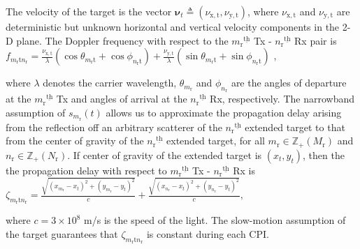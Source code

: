 \documentclass[10pt,journal]{IEEEtran}
\newcommand{\paren}[1]{\left({#1}\right)}
\newcommand{\ith}[1]    {{#1}^{\underline{\text{th}}}}
\newcommand{\rr}{_\mathrm{r}}
\newcommand{\target}{\mathrm{t}}
\theoremstyle{definition}
\begin{document}
	The velocity of the target is the vector  $\boldsymbol{\nu}_{t}\triangleq\left(\nu_\mathrm{\mathrm{x},t},\nu_\mathrm{\mathrm{y},t} \right)$, where $\nu_\mathrm{\mathrm{x},t}$ and $\nu_\mathrm{\mathrm{y},t}$ are deterministic but unknown horizontal and vertical velocity components in the 2-D plane. The Doppler frequency with respect to the $\ith{m\rr}$ Tx - $\ith{n\rr}$ Rx pair is $f_{m_\mathrm{r}\target n_\mathrm{r}} = \frac{\nu_\mathrm{\mathrm{x},t}}{\lambda}(\cos\theta_{m_\mathrm{r}\target}+\cos\phi_{n_\mathrm{r}\target})+\frac{\nu_\mathrm{\mathrm{y},\target}}{\lambda}(\sin\theta_{m_\mathrm{r}\target}+\sin\phi_{n_\mathrm{r}\target})$ \cite{hongbin_movingtarget},

	where $\lambda$ denotes the carrier wavelength, $\theta_{m_\mathrm{r}}$ and $\phi_{n_\mathrm{r}}$ are the angles of departure at the $\ith{m_\mathrm{r}}$ Tx and angles of arrival at the $\ith{n_\mathrm{r}}$ Rx, respectively. %
	The narrowband assumption of $s_{m\rr}(t)$ allows us to approximate the propagation delay arising from the reflection off an arbitrary scatterer of the $\ith{n_\mathrm{r}}$ extended target to that from the center of gravity of the $\ith{n_\mathrm{r}}$ extended target, for all $m_\mathrm{r}\in\mathbb{Z}_{+}(M_\mathrm{r})$ and $n_\mathrm{r}\in\mathbb{Z}_{+}(N_\mathrm{r})$\cite{haimovich2008mimo}. If center of gravity of the extended target is $(x_{t},y_{t})$, then the the propagation delay with respect to $\ith{m\rr}$ Tx - $\ith{n\rr}$ Rx  is
	$\zeta_{m\rr \target n\rr}=\frac{\sqrt{\paren{x_{m\rr}-x_{t}}^2+\paren{y_{m\rr}-y_{t}}^2}}{c}
	+\frac{\sqrt{\paren{x_{n\rr}-x_{t}}^2+\paren{y_{n\rr}-y_{t}}^2}}{c},$

	where $c=3\times 10^8$ m/s is the speed of the light. The slow-motion assumption of the target guarantees that $\zeta_{m\rr \target n\rr }$ is constant during each CPI. %
\end{document}
